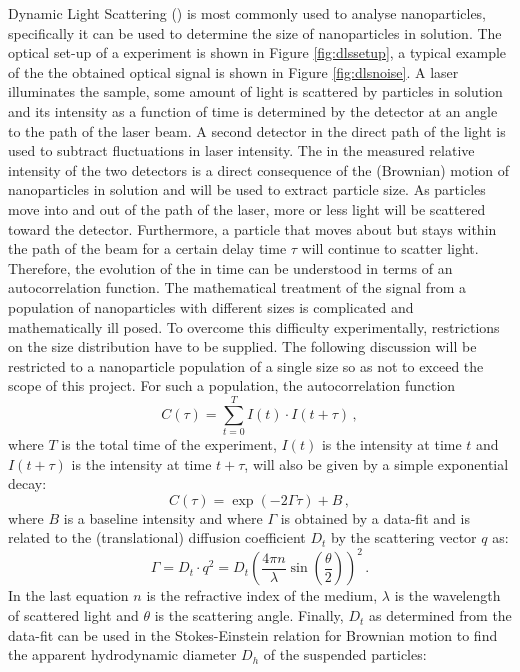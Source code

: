 Dynamic Light Scattering (\dls{}) is most commonly used to analyse nanoparticles, specifically it can be used to determine the size of nanoparticles in solution. The optical set-up of a \dls{} experiment is shown in Figure \ref{fig:dlssetup}, a typical example of the the obtained optical signal is shown in Figure \ref{fig:dlsnoise}. A laser illuminates the sample, some amount of light is scattered by particles in solution and its intensity as a function of time is determined by the detector at an angle to the path of the laser beam. A second detector in the direct path of the light is used to subtract fluctuations in laser intensity. The  in the measured relative intensity of the two detectors is a direct consequence of the (Brownian) motion of nanoparticles in solution and will be used to extract particle size. As particles move into and out of the path of the laser, more or less light will be scattered toward the detector. Furthermore, a particle that moves about but stays within the path of the beam for a certain delay time $\tau$ will continue to scatter light. Therefore, the evolution of the  in time can be understood in terms of an autocorrelation function. The mathematical treatment of the signal from a population of nanoparticles with different sizes is complicated and mathematically ill posed. To overcome this difficulty experimentally, restrictions on the size distribution have to be supplied. The following discussion will be restricted to a nanoparticle population of a single size so as not to exceed the scope of this project. For such a population, the autocorrelation function
\begin{equation}
	C(\tau) = \sum _{t=0}^T I(t)\cdot I(t + \tau) \, ,
\end{equation}
where $T$ is the total time of the experiment, $I(t)$ is the intensity at time $t$ and $I(t + \tau)$ is the intensity at time $t+\tau$, will also be given by a simple exponential decay:
\begin{equation}
	C(\tau) = \exp (-2 \Gamma \tau) + B \, ,
\end{equation}
where $B$ is a baseline intensity and where $\Gamma$ is obtained by a data-fit and is related to the (translational) diffusion coefficient $D_t$ by the scattering vector $q$ as:
\begin{equation}
	\Gamma = D_t \cdot q^2 = D_t \left( \frac{4 \pi n}{\lambda} \sin \left( \frac{\theta}{2} \right) \right) ^2 \, .
\end{equation}
In the last equation $n$ is the refractive index of the medium, $\lambda$ is the wavelength of scattered light and $\theta$ is the scattering angle. Finally, $D_t$ as determined from the data-fit can be used in the Stokes-Einstein relation for Brownian motion to find the apparent hydrodynamic diameter $D_h$ of the suspended particles:
